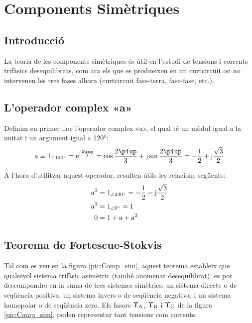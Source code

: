 \chapter{Components Simètriques}  \label{sec:comp-sim}

\section{Introducció}
La teoria de les components simètriques és útil en l'estudi de
tensions i corrents trifàsics
 desequilibrats, com ara els que es produeixen en un curtcircuit on no intervenen les tres
 fases alhora (curtcircuit fase-terra, fase-fase, etc.).

\section{L'operador complex «a»}

Definim en primer lloc l'operador complex «a», el qual té un mòdul
igual a la unitat i un argument igual a \ang{120}: 
\begin{equation}
   \au \equiv \numpd{1}{120} = \eu^{\ju\frac{2\piup}{3}} =
   \cos \frac{2\piup}{3} + \ju \sin \frac{2\piup}{3} = - \frac{1}{2} + \ju \frac{\sqrt{3}}{2}
\end{equation}

A l'hora d'utilitzar aquest operador, resulten útils les relacions
següents:
\begin{subequations}
\begin{align}
    \mathrm{a}^2 &= \num{1}_{\angle\ang{240}}= - \frac{1}{2} - \mathrm{j} \frac{\sqrt{3}}{2} \\
    \mathrm{a}^3 &= \num{1}_{\angle\ang{0}} = 1 \\
    0 &= 1+ \mathrm{a} + \mathrm{a}^2
 \end{align}
\end{subequations}

\section{\texorpdfstring{Teorema de Fortescue-Stokvis}{Teorema de Fortescue-Stokvis}}

Tal com es veu en la figura \vref{pic:Comp_sim}, aquest teorema
estableix que qualsevol sistema trifàsic asimètric (també anomenat
desequilibrat),  es pot descompondre  en la suma de tres sistemes
simètrics: un sistema directe o de seqüència positiva, un sistema
invers o de seqüència negativa, i un sistema homopolar o de
seqüència zero. Els fasors $\cmplx{\Upsilon}\ped{A}$,
$\cmplx{\Upsilon}\ped{B}$ i $\cmplx{\Upsilon}\ped{C}$ de la figura \vref{pic:Comp_sim}, poden representar tant
tensions com corrents.

